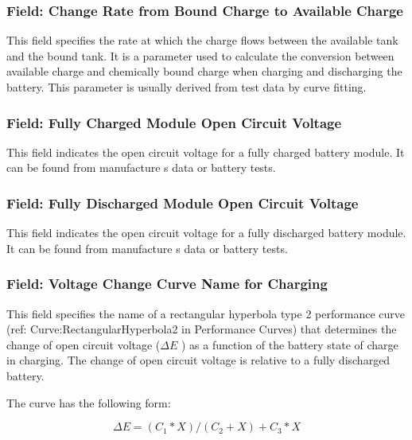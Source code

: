 \subsubsection{Field: Change Rate from Bound Charge to Available Charge}\label{field-change-rate-from-bound-charge-to-available-charge}

This field specifies the rate at which the charge flows between the available tank and the bound tank. It is a parameter used to calculate the conversion between available charge and chemically bound charge when charging and discharging the battery. This parameter is usually derived from test data by curve fitting.

\subsubsection{Field: Fully Charged Module Open Circuit Voltage}\label{field-fully-charged-module-open-circuit-voltage}

This field indicates the open circuit voltage for a fully charged battery module. It can be found from manufacture s data or battery tests.

\subsubsection{Field: Fully Discharged Module Open Circuit Voltage}\label{field-fully-discharged-module-open-circuit-voltage}

This field indicates the open circuit voltage for a fully discharged battery module. It can be found from manufacture s data or battery tests.

\subsubsection{Field: Voltage Change Curve Name for Charging}\label{field-voltage-change-curve-name-for-charging}

This field specifies the name of a rectangular hyperbola type 2 performance curve (ref: Curve:RectangularHyperbola2 in Performance Curves) that determines the change of open circuit voltage (\(\Delta E\) ) as a function of the battery state of charge in charging. The change of open circuit voltage is relative to a fully discharged battery.

The curve has the following form:

\begin{equation}
\Delta E = ({C_1}*X)/({C_2} + X) + {C_3}*X
\end{equation}


